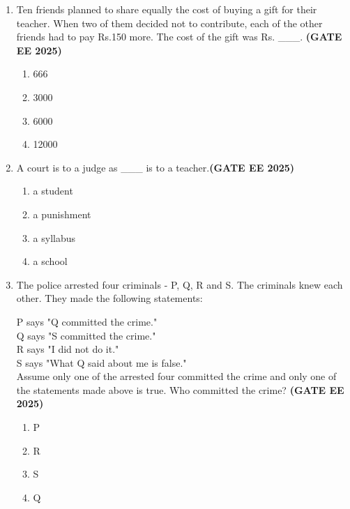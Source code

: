 \documentclass[journal,12pt,onecolumn]{IEEEtran}
\theoremstyle{remark}
\begin{document}
\begin{enumerate}
\item Ten friends planned to share equally the cost of buying a gift for their teacher. 
When two of them decided not to contribute, each of the other friends had to pay Rs.150 more. 
The cost of the gift was Rs. \_\_\_. \hfill \textbf{(GATE EE 2025)}

\begin{enumerate}
\item  666
\item  3000
\item  6000
\item 12000
\end{enumerate}

\item A court is to a judge as \_\_\_ is to a teacher.\hfill \textbf{(GATE EE 2025)}

\begin{enumerate}
\item  a student
\item  a punishment
\item  a syllabus
\item  a school
\end{enumerate}

\item The police arrested four criminals - P, Q, R and S. The criminals knew each other. 
They made the following statements:


P says "Q committed the crime."\\
 Q says "S committed the crime."\\
 R says "I did not do it."\\
 S says "What Q said about me is false."\\


Assume only one of the arrested four committed the crime and only one of the statements made above is true.  
Who committed the crime? \hfill \textbf{(GATE EE 2025)}

\begin{enumerate}
\item  P
\item  R
\item  S
\item  Q
\end{enumerate}


\end{enumerate}
\end{document}
